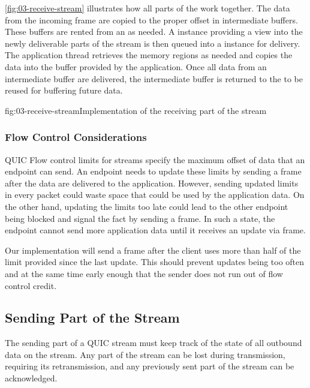 \autoref{fig:03-receive-stream} illustrates how all parts of the \ReceiveStream{} work together. The
data from the incoming \STREAM{} frame are copied to the proper offset in intermediate buffers.
These buffers are rented from an \ArrayPoolOf{\Byte{}} as needed. A \MemoryOf{\Byte} instance
providing a view into the newly deliverable parts of the stream is then queued into a \ChannelOf{}
instance for delivery. The application thread retrieves the memory regions as needed and copies the
data into the buffer provided by the application. Once all data from an intermediate buffer are
delivered, the intermediate buffer is returned to the \ArrayPoolOf{\Byte{}} to be reused for
buffering future data.

\begin{myFigure}{fig:03-receive-stream}{Implementation of the receiving part of the stream}

  \resizebox{\linewidth}{!}{}

\end{myFigure}

\subsubsection{Flow Control Considerations}

QUIC Flow control limits for streams specify the maximum offset of data that an endpoint can send.
An endpoint needs to update these limits by sending a \MAXSTREAMDATA{} frame after the data are
delivered to the application. However, sending updated limits in every packet could waste space that
could be used by the application data. On the other hand, updating the limits too late could lead to
the other endpoint being blocked and signal the fact by sending a \STREAMDATABLOCKED{} frame. In
such a state, the endpoint cannot send more application data until it receives an update via
\MAXSTREAMDATA{} frame.

Our implementation will send a \MAXSTREAMDATA{} frame after the client uses more than half of the
limit provided since the last update. This should prevent updates being too often and at the same
time early enough that the sender does not run out of flow control credit.

\subsection{Sending Part of the Stream}\label{sec:03-send-stream}

The sending part of a QUIC stream must keep track of the state of all outbound data on the stream.
Any part of the stream can be lost during transmission, requiring its retransmission, and any
previously sent part of the stream can be acknowledged.

